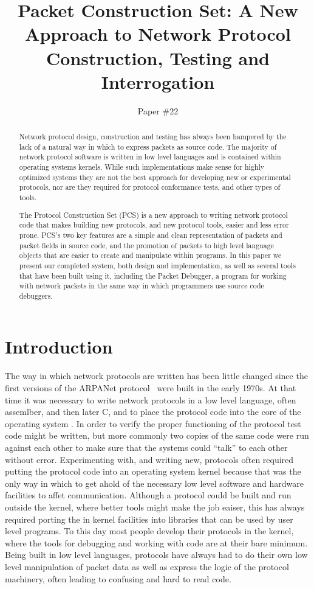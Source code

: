 \documentclass{sig-alternate-10pt}
\title{Packet Construction Set: A New Approach to Network Protocol
  Construction, Testing and Interrogation}
\author{Paper \#22}
\begin{document}
\maketitle
\begin{abstract}
Network protocol design, construction and testing has always been
hampered by the lack of a natural way in which to express packets as
source code.  The majority of network protocol software is written in
low level languages and is contained within operating systems
kernels.  While such implementations make sense for highly optimized
systems they are not the best approach for developing new or
experimental protocols, nor are they required for protocol conformance
tests, and other types of tools.

The Protocol Construction Set (PCS) is a new approach to writing
network protocol code that makes building new protocols, and new
protocol tools, easier and less error prone.  PCS's two key features
are a simple and clean representation of packets and packet fields in
source code, and the promotion of packets to high level language
objects that are easier to create and manipulate within programs.  In
this paper we present our completed system, both design and
implementation, as well as several tools that have been built using
it, including the Packet Debugger, a program for working with network
packets in the same way in which programmers use source code
debuggers.

\end{abstract}

\section{Introduction}

The way in which network protocols are written has been little changed
since the first versions of the ARPANet protocol~\cite{} were built in
the early 1970s.  At that time it was necessary to write network
protocols in a low level language, often assemlber, and then later C,
and to place the protocol code into the core of the operating system
\cite{}.  In order to verify the proper functioning of the protocol
test code might be written, but more commonly two copies of the same
code were run against each other to make sure that the systems could
``talk'' to each other without error.  Experimenting with, and writing
new, protocols often required putting the protocol code into an
operating system kernel because that was the only way in which to get
ahold of the necessary low level software and hardware facilities to
affet communication.  Although a protocol could be built and run
outside the kernel, where better tools might make the job eaiser, this
has always required porting the in kernel facilities into libraries
that can be used by user level programs.  To this day most people
develop their protocols in the kernel, where the tools for debugging
and working with code are at their bare minimum.  Being built in low
level languages, protocols have always had to do their own low level
manipulation of packet data as well as express the logic of the
protocol machinery, often leading to confusing and hard to read code.
\end{document}
